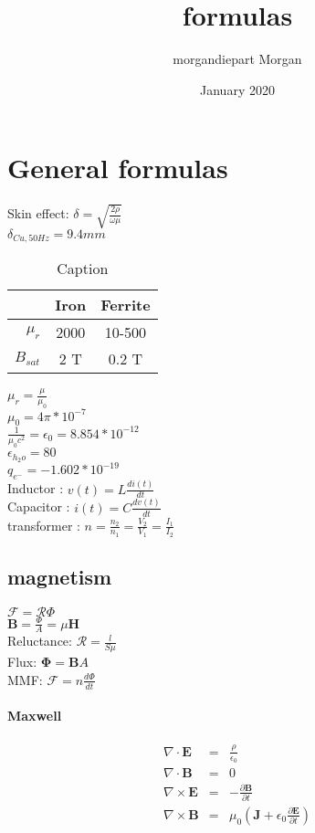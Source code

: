 \documentclass{article}
\title{formulas}
\author{morgandiepart Morgan}
\date{January 2020}
\begin{document}
\maketitle

\section{General formulas}
\paragraph{}
Skin effect: $\delta = \sqrt{\frac{2\rho}{\omega \mu}}$\\
$\delta_{Cu,50Hz} = 9.4mm$

\begin{table}[ht]
    \centering
    \begin{tabular}{r|c|c}
        & Iron & Ferrite \\
        \hline
        $\mu_r$ & 2000 & 10-500\\
        \hline
        $B_{sat}$ & 2 T & 0.2 T
    \end{tabular}
    \caption{Caption}
    \label{tab:my_label}
\end{table}{}
\noindent
$\mu_r = \frac{\mu}{\mu_0}$\\
$\mu_0 = 4 \pi * 10^{-7}$\\
$\frac{1}{\mu_0 c^2} = \epsilon_0 = 8.854*10^{-12}$\\
$\epsilon_{h_2o} = 80$\\
$q_{e^{-}}=-1.602*10^{-19}$\\
Inductor : $v(t)=L\frac{di(t)}{dt}$\\
Capacitor : $i(t)=C\frac{dv(t)}{dt}$\\
transformer : $n=\frac{n_2}{n_1}=\frac{V_2}{V_1}=\frac{I_1}{I_2}$

\subsection{magnetism}
$\mathcal{F} = \mathcal{R} \Phi$\\
$\bm{B} = \frac{\Phi}{A} = \mu \bm{H}$\\
Reluctance: $\mathcal{R} = \frac{l}{S \mu}$\\
Flux: $\bm{\Phi} = \bm{B} A$\\
MMF: $\mathcal{F} = n \frac{d\Phi}{dt}$

\paragraph{Maxwell}
\[
\begin{array}{rcl}
    \nabla \cdot \bm{E} &= &\frac{\rho}{\epsilon_0}\\
    \nabla \cdot \bm{B} &= &0\\
    \nabla \times \bm{E} &= &-\frac{\partial \bm{B}}{\partial t}\\
    \nabla \times \bm{B} &= &\mu_0(\bm{J} + \epsilon_0 \frac{\partial \bm{E}}{\partial t})
\end{array}{}
\]
\end{document}
